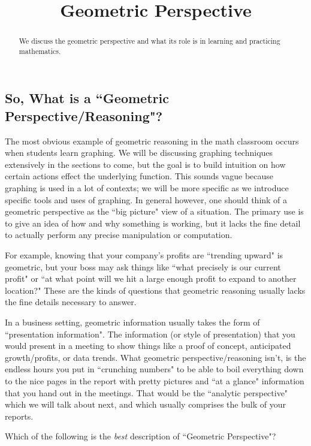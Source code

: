 \documentclass{ximera}
\title{Geometric Perspective}
\begin{document}
\begin{abstract}
    We discuss the geometric perspective and what its role is in learning and practicing mathematics.
\end{abstract}
\maketitle

\subsection*{So, What is a ``Geometric Perspective/Reasoning"?}
    
    The most obvious example of geometric reasoning in the math classroom occurs when students learn graphing. We will be discussing graphing techniques extensively in the sections to come, but the goal is to build intuition on how certain actions effect the underlying function. This sounds vague because graphing is used in a lot of contexts; we will be more specific as we introduce specific tools and uses of graphing. In general however, one should think of a geometric perspective as the ``big picture" view of a situation. The primary use is to give an idea of how and why something is working, but it lacks the fine detail to actually perform any precise manipulation or computation.
        
    For example, knowing that your company's profits are ``trending upward" is geometric, but your boss may ask things like ``what precisely is our current profit" or ``at what point will we hit a large enough profit to expand to another location?" These are the kinds of questions that geometric reasoning usually lacks the fine details necessary to answer. 
    
    In a business setting, geometric information usually takes the form of ``presentation information". The information (or style of presentation) that you would present in a meeting to show things like a proof of concept, anticipated growth/profits, or data trends. What geometric perspective/reasoning isn't, is the endless hours you put in ``crunching numbers" to be able to boil everything down to the nice pages in the report with pretty pictures and ``at a glance" information that you hand out in the meetings. That would be the ``analytic perspective" which we will talk about next, and which usually comprises the bulk of your reports.

\begin{problem}
    Which of the following is the \textit{best} description of ``Geometric Perspective"?
    \begin{multipleChoice}
    \end{multipleChoice}
\end{problem}
\end{document}
